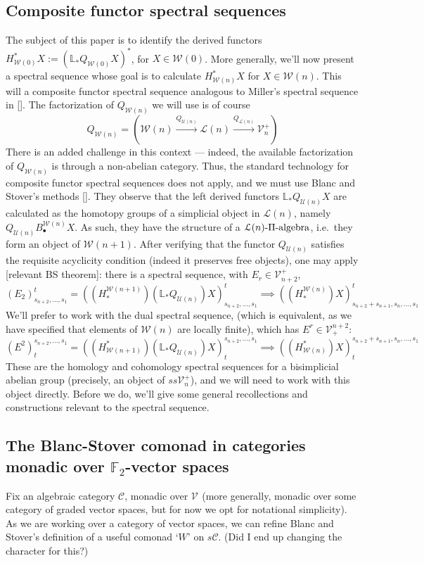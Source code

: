\documentclass[11pt]{amsart}
\theoremstyle{plain}
\theoremstyle{definition}
\renewcommand{\to}{\longrightarrow}
\newcommand{\calW}{\mathcal{W}}
\newcommand{\calU}{\mathcal{U}}
\newcommand{\calL}{\mathcal{L}}
\newcommand{\calC}{\mathcal{C}}
\newcommand{\calV}{\mathcal{V}}
\theoremstyle{plain}
\newcommand{\vect}[2]{\calV^{#1}_{#2}}
\newcommand{\F}{\mathbb{F}}
\begin{document}
\begin{Composite functor spectral sequences}
\vfil\pagebreak
\section{Composite functor spectral sequences}
The subject of this paper is to identify the derived functors $H^*_{\calW(0)}X:=(\mathbb{L}_*Q_{\calW(0)}X)^*$, for $X\in\calW(0)$. More generally, we'll now present a spectral sequence whose goal is to calculate $H^*_{\calW(n)}X$ for $X\in\calW(n)$. This will a composite functor spectral sequence analogous to Miller's spectral sequence in []. The factorization of $Q_{\calW(n)}$ we will use is of course 
\[Q_{\calW(n)}=\left(\calW(n)\overset{Q_{\calU(n)}}{\to}\calL(n)\overset{Q_{\calL(n)}}{\to}\vect{+}{n}\right)\]
There is an added challenge in this context --- indeed, the available factorization of $Q_{\calW(n)}$ is through a non-abelian category. Thus, the standard technology for composite functor spectral sequences does not apply, and we must use Blanc and Stover's methods []. They observe that the left derived functors $\mathbb{L}_*Q_{\calU(n)}X$ are calculated as the homotopy groups of a simplicial object in $\calL(n)$, namely $Q_{\calU(n)}B_\bullet^{\calW(n)}X$. As such, they have the structure of a $\calL(n)\textup{-$\Pi$-algebra}$, i.e.\ they form an object of $\calW(n+1)$.  After verifying that the functor $Q_{\calU(n)}$ satisfies the requisite acyclicity condition (indeed it preserves free objects), one may apply [relevant BS theorem]: there is a spectral sequence, with $E_r\in\vect{+}{n+2}$,
\[(E_2)_{s_{n+2},\ldots,s_1}^t=((H_*^{\calW(n+1)})(\mathbb{L}_*Q_{\calU(n)})X)_{s_{n+2},\ldots,s_1}^t\implies ((H_*^{\calW(n)})X)_{s_{n+2}+s_{n+1},s_n,\ldots,s_1}^t\]
We'll prefer to work with the dual spectral sequence, (which is equivalent, as we have specified that elements of $\calW(n)$ are locally finite), which has $E^r\in\vect{n+2}{+}$:
\[(E^2)^{s_{n+2},\ldots,s_1}_t=((H^*_{\calW(n+1)})(\mathbb{L}_*Q_{\calU(n)})X)^{s_{n+2},\ldots,s_1}_t\implies ((H^*_{\calW(n)})X)^{s_{n+2}+s_{n+1},s_n,\ldots,s_1}_t\]
These are the homology and cohomology spectral sequences for a bisimplicial abelian group (precisely, an object of $ss\vect{+}{n}$), and we will need to work with this object directly. Before we do, we'll give some general recollections and constructions relevant to the spectral sequence.

\subsection{The Blanc-Stover comonad in categories monadic over $\F_2$-vector spaces}
Fix an algebraic category $\calC$, monadic over $\vect{}{}$ (more generally, monadic over some category of graded vector spaces, but for now we opt for notational simplicity). As we are working over a category of vector spaces, we can refine Blanc and Stover's definition \cite{Blanc_Stover-Groth_SS.pdf} of a useful comonad `$W$' on $s\calC$. (Did I end up changing the character for this?)


\end{Composite functor spectral sequences}
\end{document}
